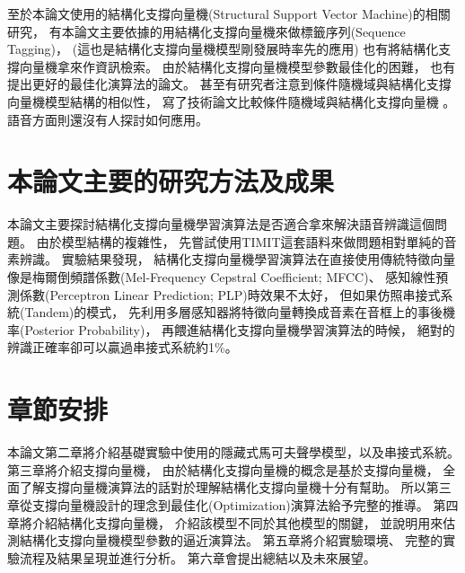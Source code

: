   至於本論文使用的結構化支撐向量機(Structural Support Vector Machine)\cite{SVMstruct}的相關研究，
  有本論文主要依據的用結構化支撐向量機來做標籤序列(Sequence  Tagging)\cite{Altun03hiddenmarkov}，
  (這也是結構化支撐向量機模型剛發展時率先的應用)
  也有將結構化支撐向量機拿來作資訊檢索\cite{JoachimsSVMperf, YisongSVMMAP}。
  由於結構化支撐向量機模型參數最佳化的困難，
  也有提出更好的最佳化演算法的論文\cite{JoachimsLinearSVM}。
  甚至有研究者注意到條件隨機域與結構化支撐向量機模型結構的相似性，
  寫了技術論文比較條件隨機域與結構化支撐向量機\cite{CRFvsSVMstruct} 。
  語音方面則還沒有人探討如何應用。

\section{本論文主要的研究方法及成果}
  本論文主要探討結構化支撐向量機學習演算法是否適合拿來解決語音辨識這個問題。
  由於模型結構的複雜性，
  先嘗試使用TIMIT這套語料來做問題相對單純的音素辨識。
  實驗結果發現，
  結構化支撐向量機學習演算法在直接使用傳統特徵向量像是梅爾倒頻譜係數(Mel-Frequency Cepstral Coefficient; MFCC)、
  感知線性預測係數(Perceptron Linear Prediction; PLP)時效果不太好，
  但如果仿照串接式系統(Tandem)的模式，
  先利用多層感知器將特徵向量轉換成音素在音框上的事後機率(Posterior Probability)，
  再餵進結構化支撐向量機學習演算法的時候，
  絕對的辨識正確率卻可以贏過串接式系統約1\%。

\section{章節安排}
  本論文第二章將介紹基礎實驗中使用的隱藏式馬可夫聲學模型，以及串接式系統。
  第三章將介紹支撐向量機，
  由於結構化支撐向量機的概念是基於支撐向量機，
  全面了解支撐向量機演算法的話對於理解結構化支撐向量機十分有幫助。
  所以第三章從支撐向量機設計的理念到最佳化(Optimization)演算法給予完整的推導。
  第四章將介紹結構化支撐向量機，
  介紹該模型不同於其他模型的關鍵，
  並說明用來估測結構化支撐向量機模型參數的逼近演算法。
  第五章將介紹實驗環境、
  完整的實驗流程及結果呈現並進行分析。
  第六章會提出總結以及未來展望。
